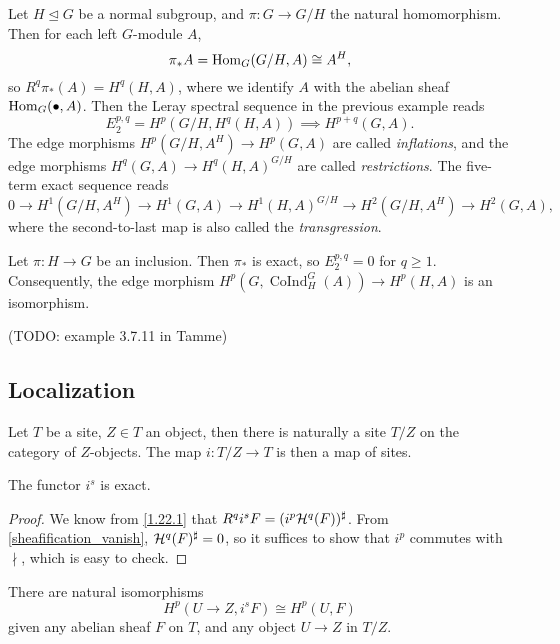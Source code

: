 \documentclass[11pt]{amsart}
\begin{document}
\begin{exm}
    Let $H \trianglelefteq G$ be a normal subgroup, and $\pi: G\to G/H$ the natural homomorphism. Then for each left $G$-module $A$,
    \[\pi_\ast A = \operatorname{Hom}_{G}(G/H, A) \cong A^H,\]
    so $R^q\pi_\ast(A) = H^q(H, A)$, where we identify $A$ with the abelian sheaf $\operatorname{Hom}_G(\bullet, A)$. Then the Leray spectral sequence in the previous example reads
    \[E_2^{p,q} = H^p(G/H, H^q(H, A)) \implies H^{p+q}(G, A).\]
    The edge morphisms $H^p(G/H, A^H)\to H^p(G,A)$ are called \emph{inflations}, and the edge morphisms $H^q(G,A)\to H^q(H,A)^{G/H}$ are called \emph{restrictions}. The five-term exact sequence reads
    \[0\to H^1(G/H, A^H) \to H^1(G,A) \to H^1(H,A)^{G/H}\to H^2(G/H, A^H)\to H^2(G,A),\]
    where the second-to-last map is also called the \emph{transgression}.
\end{exm}

\begin{exm}
    Let $\pi:H\to G$ be an inclusion. Then $\pi_\ast$ is exact, so $E_2^{p,q} = 0$ for $q\ge 1$. Consequently, the edge morphism $H^p(G, \operatorname{CoInd}_H^G(A)) \to H^p(H, A)$ is an isomorphism.
\end{exm}

\begin{exm}
(TODO: example 3.7.11 in Tamme)
\end{exm}



\subsection{Localization}

Let $T$ be a site, $Z\in T$ an object, then there is naturally a site $T/Z$ on the category of $Z$-objects. The map $i: T/Z\to T$ is then a map of sites.

\begin{lem}
\label{is_exact}
    The functor $i^s$ is exact.
\end{lem}

\begin{proof}
    We know from \ref{1.22.1} that $R^qi^sF = (i^p\mathcal{H}^q(F))^\sharp$. From \ref{sheafification_vanish}, $\mathcal{H}^q(F)^\sharp = 0$, so it suffices to show that $i^p$ commutes with $\nmid$, which is easy to check.
\end{proof}

\begin{cor}
\label{localization_same_cohomology}
    There are natural isomorphisms
    \[H^p(U\to Z, i^sF) \cong H^p(U, F)\]
    given any abelian sheaf $F$ on $T$, and any object $U\to Z$ in $T/Z$.
\end{cor}
\end{document}

